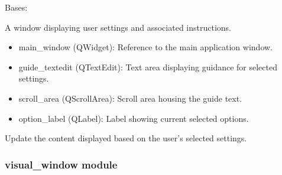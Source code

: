 \documentclass[a4paper,10pt,english]{sphinxmanual}
\begin{document}
\begin{fulllineitems}
\label{\detokenize{gui:src.gui.settings_window.SettingsWindow}}
\pysigstartsignatures
{}
\pysigstopsignatures
\sphinxAtStartPar
Bases: 

\sphinxAtStartPar
A window displaying user settings and associated instructions.
\begin{description}
\begin{itemize}
\item {} 
\sphinxAtStartPar
main\_window (QWidget): Reference to the main application window.

\item {} 
\sphinxAtStartPar
guide\_textedit (QTextEdit): Text area displaying guidance for selected settings.

\item {} 
\sphinxAtStartPar
scroll\_area (QScrollArea): Scroll area housing the guide text.

\item {} 
\sphinxAtStartPar
option\_label (QLabel): Label showing current selected options.

\end{itemize}

\end{description}

\begin{fulllineitems}
\label{\detokenize{gui:src.gui.settings_window.SettingsWindow.update_content}}
\pysigstartsignatures
{}
\pysigstopsignatures
\sphinxAtStartPar
Update the content displayed based on the user’s selected settings.

\end{fulllineitems}


\end{fulllineitems}



\subsubsection{visual\_window module}
\label{\detokenize{gui:module-src.gui.visual_window}}\label{\detokenize{gui:visual-window-module}}
\end{document}
